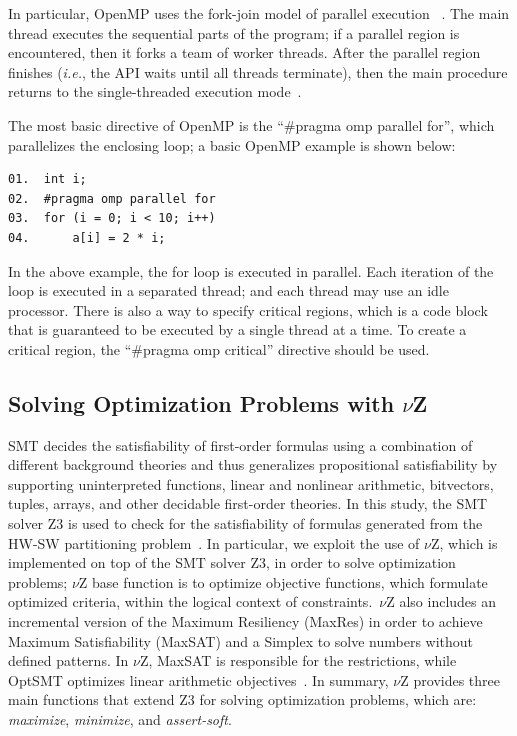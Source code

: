 In particular, OpenMP uses the fork-join model of parallel execution ~\cite{OpenMP1998}. The main thread executes the sequential parts of the program; if a parallel region is encountered, then it forks a team of worker threads. After the parallel region finishes ({\it i.e.}, the API waits until all threads terminate), then the main procedure returns to the single-threaded execution mode~\cite{Wu2014}.

The most basic directive of OpenMP is the ``\#pragma omp parallel for'', which parallelizes the enclosing loop; a basic OpenMP example is shown below:

\begin{lstlisting}[caption=OpenMP basic sample]
01.  int i;
02.  #pragma omp parallel for
03.  for (i = 0; i < 10; i++)
04.      a[i] = 2 * i;
\end{lstlisting}

In the above example, the for loop is executed in parallel. Each iteration of the loop is executed in a separated thread; and each thread may use an idle processor. There is also a way to specify critical regions, which is a code block that is guaranteed to be executed by a single thread at a time. To create a critical region, the ``\#pragma omp critical'' directive should be used.
\subsection{Solving Optimization Problems with $\nu$Z}
\label{Optimization-with-Vz}

SMT decides the satisfiability of first-order formulas using a combination of different background theories and thus generalizes propositional satisfiability by supporting uninterpreted functions, linear and nonlinear arithmetic, bitvectors, tuples, arrays, and other decidable first-order theories. In this study, the SMT solver Z3 is used to check for the satisfiability of formulas generated from the HW-SW partitioning problem~\cite{Bjorner2014}. In particular, we exploit the use of $\nu$Z, which is implemented on top of the SMT solver Z3, in order to solve optimization problems; $\nu$Z base function is to optimize objective functions, which formulate optimized criteria, within the logical context of constraints.~$\nu$Z also includes an incremental version of the Maximum Resiliency (MaxRes) \cite{Federica2008} in order to achieve Maximum Satisfiability (MaxSAT) \cite{NarodytskaN} and a Simplex to solve numbers without defined patterns. In $\nu$Z, MaxSAT is responsible for the restrictions, while OptSMT optimizes linear arithmetic objectives~\cite{Bjorner2015}. In summary, $\nu$Z provides three main functions that extend Z3 for solving optimization problems, which are: \textit{maximize}, \textit{minimize}, and \textit{assert-soft}.

